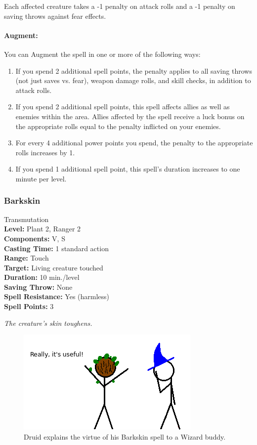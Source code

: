 Each affected creature takes a -1 penalty on attack rolls and a -1 penalty on saving throws against fear effects.

\paragraph{Augment:} You can Augment the spell in one or more of the following ways:
\begin{enumerate}
 \item If you spend 2 additional spell points, the penalty applies to all saving throws (not just saves vs. fear), weapon damage rolls, and skill checks, in addition to attack rolls.
 \item If you spend 2 additional spell points, this spell affects allies as well as enemies within the area.
 Allies affected by the spell receive a luck bonus on the appropriate rolls equal to the penalty inflicted on your enemies.
 \item For every 4 additional power points you spend, the penalty to the appropriate rolls increases by 1.
 \item If you spend 1 additional spell point, this spell's duration increases to one minute per level.
\end{enumerate}

\subsubsection{Barkskin}
\label{Spell:Barkskin}
Transmutation
\\ \textbf{Level:} Plant 2, Ranger 2
\\ \textbf{Components:} V, S
\\ \textbf{Casting Time:} 1 standard action
\\ \textbf{Range:} Touch
\\ \textbf{Target:} Living creature touched
\\ \textbf{Duration:} 10 min./level
\\ \textbf{Saving Throw:} None
\\ \textbf{Spell Resistance:} Yes (harmless)
\\ \textbf{Spell Points:} 3

\emph{The creature's skin toughens.}

\begin{figure}
  \caption{Druid explains the virtue of his Barkskin spell to a Wizard buddy.}
  \centering
    \includegraphics{Pics/Barkskin.png}
\end{figure}

